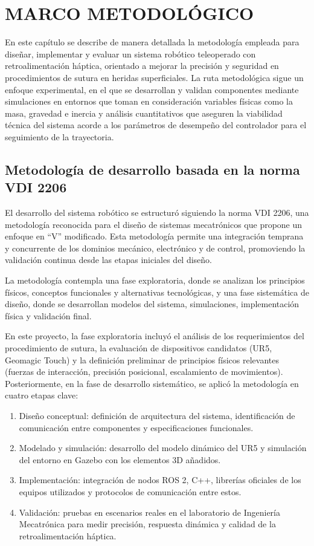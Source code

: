 \chapter{MARCO METODOLÓGICO}

En este capítulo se describe de manera detallada la metodología empleada para
diseñar, implementar y evaluar un sistema robótico teleoperado con
retroalimentación háptica, orientado a mejorar la precisión y seguridad en
procedimientos de sutura en heridas superficiales. La ruta metodológica sigue
un enfoque experimental, en el que se desarrollan y validan componentes
mediante simulaciones en entornos que toman en consideración variables físicas
como la masa, gravedad e inercia y análisis cuantitativos que aseguren la
viabilidad técnica del sistema acorde a los parámetros de desempeño del
controlador para el seguimiento de la trayectoria.

\section{Metodología de desarrollo basada en la norma VDI 2206}

El desarrollo del sistema robótico se estructuró siguiendo la norma VDI 2206,
una metodología reconocida para el diseño de sistemas mecatrónicos que propone
un enfoque en “V” modificado. Esta metodología permite una integración temprana
y concurrente de los dominios mecánico, electrónico y de control, promoviendo
la validación continua desde las etapas iniciales del diseño.

La metodología contempla una fase exploratoria, donde se analizan los
principios físicos, conceptos funcionales y alternativas tecnológicas, y una
fase sistemática de diseño, donde se desarrollan modelos del sistema,
simulaciones, implementación física y validación final.

En este proyecto, la fase exploratoria incluyó el análisis de los
requerimientos del procedimiento de sutura, la evaluación de dispositivos
candidatos (UR5, Geomagic Touch) y la definición preliminar de principios
físicos relevantes (fuerzas de interacción, precisión posicional, escalamiento
de movimientos). Posteriormente, en la fase de desarrollo sistemático, se
aplicó la metodología en cuatro etapas clave:

\begin{enumerate}
	\item Diseño conceptual: definición de arquitectura del sistema,
	      identificación de comunicación entre componentes y
	      especificaciones
	      funcionales.
	\item Modelado y simulación: desarrollo del modelo dinámico del UR5 y
	      simulación del entorno en Gazebo con los elementos 3D añadidos.
	\item Implementación: integración de nodos ROS 2, C++, librerías
	      oficiales
	      de los equipos utilizados y protocolos de comunicación entre
	      estos.
	\item Validación: pruebas en escenarios reales en el laboratorio de
	      Ingeniería Mecatrónica para medir precisión, respuesta dinámica y
	      calidad de la
	      retroalimentación háptica.
\end{enumerate}

